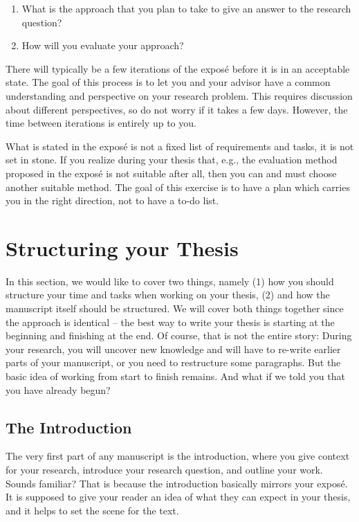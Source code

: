 \documentclass[a4paper]{article}
\begin{document}
\begin{enumerate}
    \item What is the approach that you plan to take to give an answer to the research question?
    \item How will you evaluate your approach?
\end{enumerate}

There will typically be a few iterations of the expos\'e before it is in an acceptable state.
The goal of this process is to let you and your advisor have a common understanding and perspective on your research problem.
This requires discussion about different perspectives, so do not worry if it takes a few days.
However, the time between iterations is entirely up to you.

What is stated in the expos\'e is not a fixed list of requirements and tasks, it is not set in stone.
If you realize during your thesis that, e.g., the evaluation method proposed in the expos\'e is not suitable after all, then you can and must choose another suitable method.
The goal of this exercise is to have a plan which carries you in the right direction, not to have a to-do list.

\section{Structuring your Thesis}
\label{sec:structure}

In this section, we would like to cover two things, namely (1) how you should structure your time and tasks when working on your thesis, (2) and how the manuscript itself should be structured.
We will cover both things together since the approach is identical -- the best way to write your thesis is starting at the beginning and finishing at the end.
Of course, that is not the entire story: During your research, you will uncover new knowledge and will have to re-write earlier parts of your manuscript, or you need to restructure some paragraphs.
But the basic idea of working from start to finish remains.
And what if we told you that you have already begun?

\subsection{The Introduction}

The very first part of any manuscript is the introduction, where you give context for your research, introduce your research question, and outline your work.
Sounds familiar?
That is because the introduction basically mirrors your expos\'e.
It is supposed to give your reader an idea of what they can expect in your thesis, and it helps to set the scene for the text.
\end{document}
